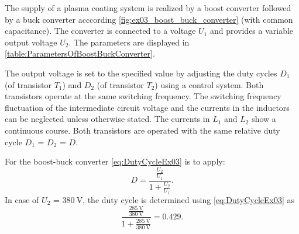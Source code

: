 



The supply of a plasma coating system is realized by a boost converter followed by a buck converter acccording \autoref{fig:ex03_boost_buck_converter} (with common capacitance).
The converter is connected to a voltage $U_\mathrm{1}$ and provides a variable output voltage $U_\mathrm{2}$. The parameters are displayed in \autoref{table:ParametersOfBoostBuckConverter}.
\vspace{2em}\par

\par

\par


The output voltage is set to the specified value by adjusting the duty cycles $D_\mathrm{1}$ (of transistor $T_\mathrm{1}$) 
and $D_\mathrm{2}$ (of transistor $T_\mathrm{2}$) using a control system. Both transistors operate at the same switching frequency. 
The switching frequency fluctuation of the intermediate circuit voltage and the currents in the inductors can be neglected unless otherwise stated. 
The currents in $L_\mathrm{1}$ and $L_\mathrm{2}$ show a continuous course. Both transistors are operated with the 
same relative duty cycle $D_\mathrm{1}$ = $D_\mathrm{2}$ = $D$.


\begin{solutionblock}
    For the boost-buck converter \eqref{eq:DutyCycleEx03} is to apply:
    \begin{equation}
        D = \frac{\frac{U_\mathrm{2}}{U_\mathrm{1}}} {1+{\frac{U_\mathrm{2}}{U_\mathrm{1}}}}.
        \label{eq:DutyCycleEx03}
    \end{equation}
    In case of $U_\mathrm{2}$ = $\SI{380}{\volt}$, the duty cycle is determined using \eqref{eq:DutyCycleEx03} as
    \begin{equation}
       \frac{\frac{\SI{285}{\volt}}{\SI{380}{\volt}}} {1+{\frac{\SI{285}{\volt}}{\SI{380}{\volt}}}} = 0.429.
    \end{equation}
\end{solutionblock}


